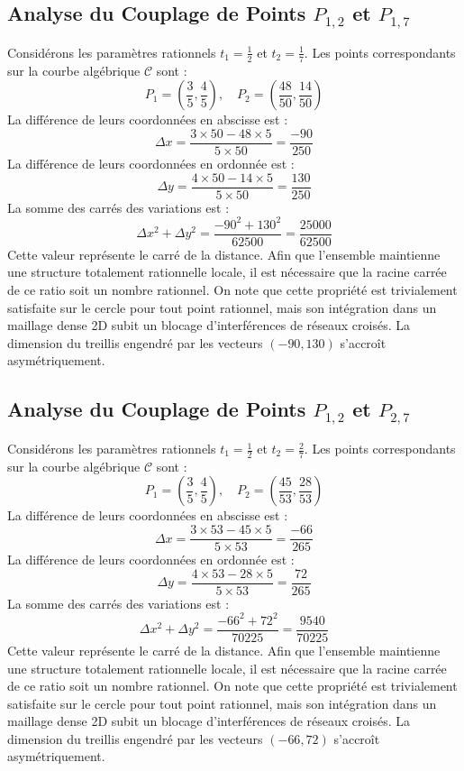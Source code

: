 \documentclass[12pt, a4paper]{article}
\begin{document}
\subsection{Analyse du Couplage de Points $P_{1,2}$ et $P_{1,7}$}
Considérons les paramètres rationnels $t_1 = \frac{1}{2}$ et $t_2 = \frac{1}{7}$.
Les points correspondants sur la courbe algébrique $\mathcal{C}$ sont :
$$ P_1 = \left( \frac{3}{5}, \frac{4}{5} \right), \quad P_2 = \left( \frac{48}{50}, \frac{14}{50} \right) $$
La différence de leurs coordonnées en abscisse est :
$$ \Delta x = \frac{3 \times 50 - 48 \times 5}{5 \times 50} = \frac{-90}{250} $$
La différence de leurs coordonnées en ordonnée est :
$$ \Delta y = \frac{4 \times 50 - 14 \times 5}{5 \times 50} = \frac{130}{250} $$
La somme des carrés des variations est :
$$ \Delta x^2 + \Delta y^2 = \frac{ -90^2 + 130^2 }{ 62500 } = \frac{ 25000 }{ 62500 } $$
Cette valeur représente le carré de la distance. Afin que l'ensemble maintienne une structure totalement rationnelle locale, il est nécessaire que la racine carrée de ce ratio soit un nombre rationnel. On note que cette propriété est trivialement satisfaite sur le cercle pour tout point rationnel, mais son intégration dans un maillage dense 2D subit un blocage d'interférences de réseaux croisés. La dimension du treillis engendré par les vecteurs $( -90, 130 )$ s'accroît asymétriquement.


\subsection{Analyse du Couplage de Points $P_{1,2}$ et $P_{2,7}$}
Considérons les paramètres rationnels $t_1 = \frac{1}{2}$ et $t_2 = \frac{2}{7}$.
Les points correspondants sur la courbe algébrique $\mathcal{C}$ sont :
$$ P_1 = \left( \frac{3}{5}, \frac{4}{5} \right), \quad P_2 = \left( \frac{45}{53}, \frac{28}{53} \right) $$
La différence de leurs coordonnées en abscisse est :
$$ \Delta x = \frac{3 \times 53 - 45 \times 5}{5 \times 53} = \frac{-66}{265} $$
La différence de leurs coordonnées en ordonnée est :
$$ \Delta y = \frac{4 \times 53 - 28 \times 5}{5 \times 53} = \frac{72}{265} $$
La somme des carrés des variations est :
$$ \Delta x^2 + \Delta y^2 = \frac{ -66^2 + 72^2 }{ 70225 } = \frac{ 9540 }{ 70225 } $$
Cette valeur représente le carré de la distance. Afin que l'ensemble maintienne une structure totalement rationnelle locale, il est nécessaire que la racine carrée de ce ratio soit un nombre rationnel. On note que cette propriété est trivialement satisfaite sur le cercle pour tout point rationnel, mais son intégration dans un maillage dense 2D subit un blocage d'interférences de réseaux croisés. La dimension du treillis engendré par les vecteurs $( -66, 72 )$ s'accroît asymétriquement.
\end{document}
